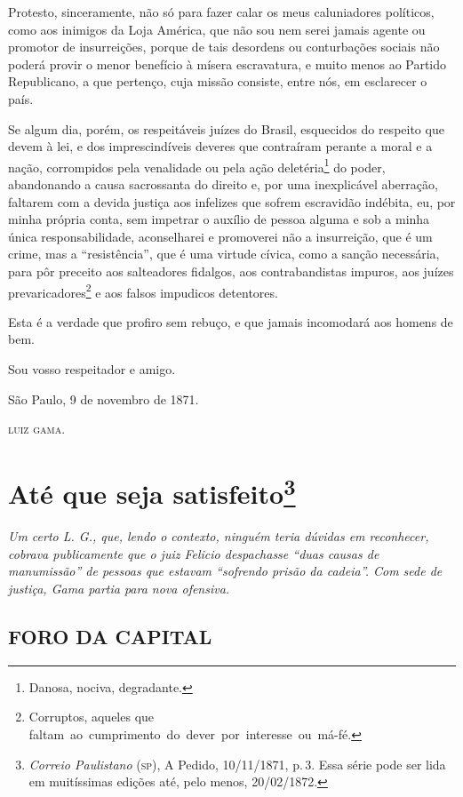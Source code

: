 Protesto, sinceramente, não só para fazer calar os meus caluniadores
políticos, como aos inimigos da Loja América, que não sou nem serei
jamais agente ou promotor de insurreições, porque de tais desordens ou
conturbações sociais não poderá provir o menor benefício à mísera
escravatura, e muito menos ao Partido Republicano, a que pertenço, cuja
missão consiste, entre nós, em esclarecer o país.

Se algum dia, porém, os respeitáveis juízes do Brasil, esquecidos do
respeito que devem à lei, e dos imprescindíveis deveres que contraíram
perante a moral e a nação, corrompidos pela venalidade ou pela ação
deletéria\footnote{ Danosa, nociva, degradante.} do poder, abandonando
a causa sacrossanta do direito e, por uma inexplicável aberração,
faltarem com a devida justiça aos infelizes que sofrem escravidão
indébita, eu, por minha própria conta, sem impetrar o auxílio de pessoa
alguma e sob a minha única responsabilidade, aconselharei e promoverei
não a insurreição, que é um crime, mas a ``resistência'', que é uma
virtude cívica, como a sanção necessária, para pôr preceito aos
salteadores fidalgos, aos contrabandistas impuros, aos juízes
prevaricadores\footnote{ Corruptos, aqueles que
  faltam~ao~cumprimento~do~dever~por~interesse~ou~má-fé.} e aos falsos
impudicos detentores.

Esta é a verdade que profiro sem rebuço, e que jamais incomodará aos
homens de bem.

Sou vosso respeitador e amigo.

São Paulo, 9 de novembro de 1871.

\textsc{luiz gama}.

\chapter{Até que seja satisfeito\footnote{\emph{Correio Paulistano} (\textsc{sp}), A Pedido, 10/11/1871,
  p.\,3. Essa série pode ser lida em muitíssimas edições até, pelo menos,
  20/02/1872.}} %

\begin{didascalia}
\emph{Um certo L. G., que, lendo o contexto, ninguém teria dúvidas em
reconhecer, cobrava publicamente que o juiz Felicio despachasse ``duas
causas de manumissão'' de pessoas que estavam ``sofrendo prisão da
cadeia''. Com sede de justiça, Gama partia para nova ofensiva.}
\end{didascalia}


\section{FORO DA CAPITAL}


